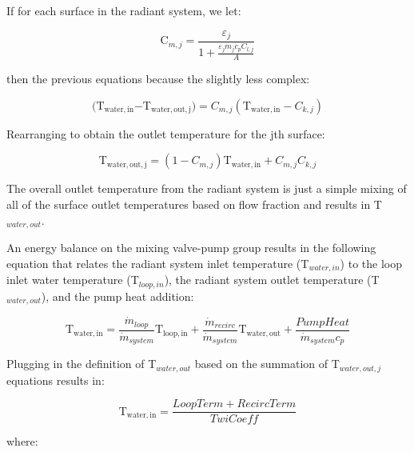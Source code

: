 If for each surface in the radiant system, we let:

\begin{equation}
{{\mathrm{C}}_{m,j}} = \frac{{{\varepsilon_j}}}{{1 + \frac{{{\varepsilon_j}{{\dot m}_j}{c_p}{C_{l,j}}}}{A}}}
\end{equation}

then the previous equations because the slightly less complex:

\begin{equation}
{\mathrm{(}}{{\mathrm{T}}_{{\mathrm{water,in}}}}{\mathrm{  -  }}{{\mathrm{T}}_{{\mathrm{water,out,j}}}}{\mathrm{)}} = {C_{m,j}}\left( {{{\mathrm{T}}_{{\mathrm{water,in}}}} - {C_{k,j}}} \right)
\end{equation}

Rearranging to obtain the outlet temperature for the jth surface:

\begin{equation}
{{\mathrm{T}}_{{\mathrm{water,out,j}}}} = \left( {1 - {C_{m,j}}} \right){{\mathrm{T}}_{{\mathrm{water,in}}}} + {C_{m,j}}{C_{k,j}}
\end{equation}

The overall outlet temperature from the radiant system is just a simple mixing of all of the surface outlet temperatures based on flow fraction and results in T\(_{water,out}\).

An energy balance on the mixing valve-pump group results in the following equation that relates the radiant system inlet temperature (T\(_{water,in}\)) to the loop inlet water temperature (T\(_{loop,in}\)), the radiant system outlet temperature (T\(_{water,out}\)), and the pump heat addition:

\begin{equation}
{{\mathrm{T}}_{{\mathrm{water,in}}}} = \frac{{{{\dot m}_{loop}}}}{{{{\dot m}_{system}}}}{{\mathrm{T}}_{{\mathrm{loop,in}}}} + \frac{{{{\dot m}_{recirc}}}}{{{{\dot m}_{system}}}}{{\mathrm{T}}_{{\mathrm{water,out}}}} + \frac{{PumpHeat}}{{{{\dot m}_{system}}{c_p}}}
\end{equation}

Plugging in the definition of T\(_{water,out}\) based on the summation of T\(_{water,out,j}\) equations results in:

\begin{equation}
{{\mathrm{T}}_{{\mathrm{water,in}}}} = \frac{{LoopTerm + RecircTerm}}{{TwiCoeff}}
\end{equation}

where:


